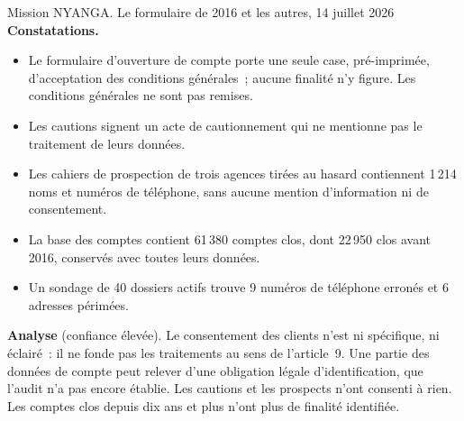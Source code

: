 \begin{boxscenario}{Mission NYANGA. Le formulaire de 2016 et les autres, 14 juillet 2026}
\textbf{Constatations.}
\begin{itemize}
    \item Le formulaire d'ouverture de compte porte une seule case,
          pré-imprimée, d'acceptation des conditions générales~; aucune
          finalité n'y figure. Les conditions générales ne sont pas remises.
    \item Les cautions signent un acte de cautionnement qui ne mentionne
          pas le traitement de leurs données.
    \item Les cahiers de prospection de trois agences tirées au hasard
          contiennent 1\,214 noms et numéros de téléphone, sans aucune
          mention d'information ni de consentement.
    \item La base des comptes contient 61\,380 comptes clos, dont 22\,950
          clos avant 2016, conservés avec toutes leurs données.
    \item Un sondage de 40 dossiers actifs trouve 9 numéros de téléphone
          erronés et 6 adresses périmées.
\end{itemize}

\textbf{Analyse} (confiance élevée). Le consentement des clients n'est ni
spécifique, ni éclairé~: il ne fonde pas les traitements au sens de
l'article~9. Une partie des données de compte peut relever d'une obligation
légale d'identification, que l'audit n'a pas encore établie. Les cautions et les prospects n'ont
consenti à rien. Les comptes clos depuis dix ans et plus n'ont plus de
finalité identifiée.
\end{boxscenario}

